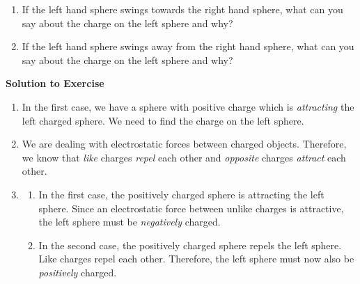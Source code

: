 {\begin{mdframed}[linewidth=4, leftmargin=40, rightmargin=40]
\begin{exercise}
\begin{enumerate}[noitemsep, label=\textbf{\arabic*}. ]
            \leftskip=20pt\rightskip=\leftskip\label{m38780*uid3}\item If the left hand sphere swings towards the right hand sphere, what can you say about the charge on the left sphere and why?
\label{m38780*uid4}\item If the left hand sphere swings away from the right hand sphere, what can you say about the charge on the left sphere and why?
\end{enumerate}
      \vspace{5pt}
      \label{m38780*solfhsst!!!underscore!!!id210}\noindent\textbf{Solution to Exercise } \label{m38780*listfhsst!!!underscore!!!id210}\begin{enumerate}[noitemsep, label=\textbf{Step} \textbf{\arabic*}. ] 
            \leftskip=20pt\rightskip=\leftskip\item  
      \label{m38780*id201084}In the first case, we have a sphere with positive charge which is \textsl{attracting} the left charged sphere. We need to find the charge on the left sphere.\par 
      \item  
      \label{m38780*id201097}We are dealing with electrostatic forces between charged objects. Therefore, we know that \textsl{like} charges \textsl{repel} each other and \textsl{opposite} charges \textsl{attract} each other.\par 
      \item  
      \label{m38780*id201126}\begin{enumerate}[noitemsep, label=\textbf{\alph*}. ] 
            \leftskip=20pt\rightskip=\leftskip\label{m38780*uid5}\item In the first case, the positively charged sphere is attracting the left sphere. Since an electrostatic force between unlike charges is attractive, the left sphere must be \textsl{negatively} charged.
\label{m38780*uid6}\item In the second case, the positively charged sphere repels the left sphere. Like charges repel each other. Therefore, the left sphere must now also be \textsl{positively} charged.
\end{enumerate}
      \end{enumerate}
    \end{exercise}
    \end{mdframed}
    }
    \noindent
\label{m38780*notfhsst!!!underscore!!!id250}
